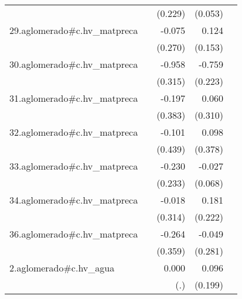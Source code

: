 {\begin{longtable}{l*{4}{D{.}{.}{-1}}}
            &                     &     (0.229)         &     (0.053)         &                     \\
\addlinespace
29.aglomerado#c.hv\_matpreca&                     &      -0.075         &       0.124         &                     \\
            &                     &     (0.270)         &     (0.153)         &                     \\
\addlinespace
30.aglomerado#c.hv\_matpreca&                     &      -0.958\sym{**} &      -0.759\sym{***}&                     \\
            &                     &     (0.315)         &     (0.223)         &                     \\
\addlinespace
31.aglomerado#c.hv\_matpreca&                     &      -0.197         &       0.060         &                     \\
            &                     &     (0.383)         &     (0.310)         &                     \\
\addlinespace
32.aglomerado#c.hv\_matpreca&                     &      -0.101         &       0.098         &                     \\
            &                     &     (0.439)         &     (0.378)         &                     \\
\addlinespace
33.aglomerado#c.hv\_matpreca&                     &      -0.230         &      -0.027         &                     \\
            &                     &     (0.233)         &     (0.068)         &                     \\
\addlinespace
34.aglomerado#c.hv\_matpreca&                     &      -0.018         &       0.181         &                     \\
            &                     &     (0.314)         &     (0.222)         &                     \\
\addlinespace
36.aglomerado#c.hv\_matpreca&                     &      -0.264         &      -0.049         &                     \\
            &                     &     (0.359)         &     (0.281)         &                     \\
\addlinespace
2.aglomerado#c.hv\_agua&                     &       0.000         &       0.096         &                     \\
            &                     &         (.)         &     (0.199)         &                     \\

\end{longtable}}
